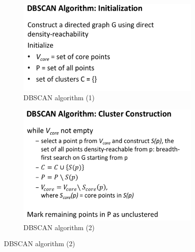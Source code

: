 \begin{figure}[htp]
  \centering
  \begin{subfigure}{.48\textwidth}
      \centering
      \includegraphics[width=\textwidth]{images/dbscan1.png}
      \caption{DBSCAN algorithm (1)}
      \label{fig:dbscan1}
  \end{subfigure}%
  \hfill
  \begin{subfigure}{.48\textwidth}
        \centering
        \includegraphics[width=\textwidth]{images/dbscan2.png}
        \caption{DBSCAN algorithm (2)}
        \label{fig:dbscan2}
  \end{subfigure}
\end{figure}


